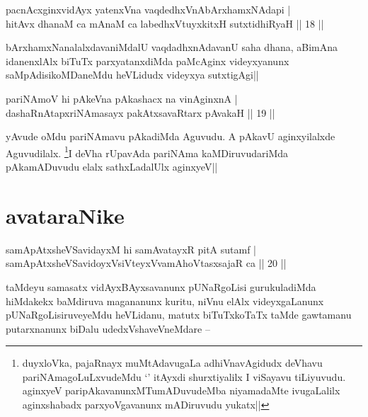 
\begin{shl}
pacnAcxginxvidAyx yatenxVna vaqdedhxVnAbArxhamxNAdapi | \\
hitAvx dhanaM ca mAnaM ca labedhxVtuyxkitxH sutxtidhiRyaH \hfill|| 18 || 
\end{shl}

\begin{artha}
bArxhamxNanalalxdavaniMdalU vaqdadhxnAdavanU saha dhana, aBimAna 
idanenxlAlx biTuTx parxyatanxdiMda paMcAginx videyxyanunx 
saMpAdisikoMDaneMdu heVLidudx videyxya sutxtigAgi||
\end{artha}


\begin{shl}
pariNAmoV hi pAkeVna pAkashacx na vinA\s ginxnA | \\
dashaRnAtapxriNAmasayx pakAtxsavaRtarx pAvakaH \hfill|| 19 || 
\end{shl}

\begin{artha}
yAvude oMdu pariNAmavu pAkadiMda Aguvudu. A pAkavU aginxyilalxde 
Aguvudilalx. \footnote[1]{duyxloVka, pajaRnayx muMtAdavugaLa 
adhiVnavAgidudx deVhavu pariNAmagoLuLxvudeMdu `\stext' itAyxdi 
shurxtiyalilx I viSayavu tiLiyuvudu. aginxyeV 
paripAkavanunxMTumADuvudeMba niyamadaMte ivugaLalilx aginxshabadx 
parxyoVgavanunx mADiruvudu yukatx||}I deVha rUpavAda pariNAma kaMDiruvudariMda 
pAkamADuvudu elalx sathxLadalUlx aginxyeV||
\end{artha}

\section*{avataraNike}

\begin{shl}
samApAtxsheVSavidayxM hi samAvatayxR pitA sutamf | \\
samApAtxsheVSavidoyxV\s siVteyxVvamAhoVtasxsajaR ca \hfill|| 20 || 
\end{shl}

\begin{artha}
taMdeyu samasatx vidAyxBAyxsavanunx pUNaRgoLisi gurukuladiMda 
hiMdakekx baMdiruva magananunx kuritu, niVnu elAlx videyxgaLanunx 
pUNaRgoLisiruveyeMdu heVLidanu, matutx biTuTxkoTaTx taMde gawtamanu 
putarxnanunx biDalu udedxVshaveVneMdare --
\end{artha}

